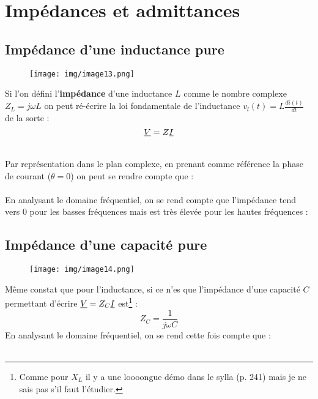 \documentclass[11pt, a4paper, openany]{book}
\begin{document}
		\section{Impédances et admittances}
		\subsection{Impédance d'une inductance pure}
		\begin{wrapfigure}[10]{r}{3cm}
			\texttt{[image: img/image13.png]}
		\end{wrapfigure}
		Si l'on défini l'\textbf{impédance} d'une inductance $L$ comme le nombre complexe $Z_L = j\omega L$ on peut ré-écrire la loi fondamentale de l'inductance $v_l(t) = L\frac{di(t)}{dt}$ de la sorte : 
		\begin{equation}
		\phas{V} = Z\phas{I}
		\end{equation}
		
		\ \\
		
		Par représentation dans le plan complexe, en prenant comme référence la phase de courant ($\theta = 0$) on peut se rendre compte que :\\
		
		\ \\
		
		En analysant le domaine fréquentiel, on se rend compte que l'impédance tend vers 0 pour les basses fréquences mais est très élevée pour les hautes fréquences :\\
		
		
		\subsection{Impédance d'une capacité pure}
		\begin{wrapfigure}[7]{l}{3cm}
			\texttt{[image: img/image14.png]}
		\end{wrapfigure}
		Même constat que pour l'inductance, si ce n'es que l'impédance d'une capacité $C$ permettant d'écrire $\phas{V} = Z_C\phas{I}$ est\footnote{Comme pour $X_L$ il y a une loooongue démo dans le sylla (p. 241) mais je ne sais pas s'il faut l'étudier.} : 
		\begin{equation}
		Z_C = \frac{1}{j\omega C}
		\end{equation}
		En analysant le domaine fréquentiel, on se rend cette fois compte que :\\
		\ \\
		
\end{document}
